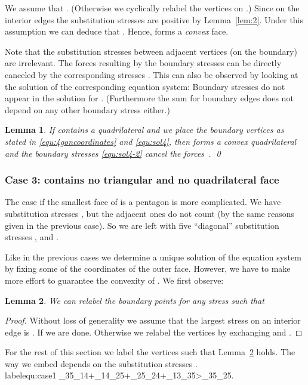 \documentclass{article}
\theoremstyle{plain} \newtheorem{thm}{Theorem}[section]
\newtheorem{lem}{Lemma}[section]
\newcommand{\ot}{\tilde{\omega}}
\begin{document}
We assume that .
(Otherwise we cyclically relabel the vertices on .) 
Since  on the interior edges the substitution stresses are positive by Lemma~\ref{lem:2}. Under this assumption we can deduce that . Hence,   forms a \emph{convex} face.


Note that the substitution stresses  between adjacent
vertices (on the boundary) are irrelevant. The 
forces resulting by the boundary stresses  
can be directly canceled by the
corresponding stresses . 
This can also be observed by looking at the solution  
of the corresponding equation system:
Boundary stresses do not appear in the solution for . (Furthermore 
the sum  for boundary edges 
does not depend on any other boundary stress either.)

\begin{lem}
If  contains a quadrilateral and we place the boundary vertices as
stated in \eqref{equ:4goncoordinates} and \eqref{equ:sol4}, 
then  forms a convex quadrilateral 
and the boundary stresses
 \eqref{equ:sol4-2}
 cancel the
forces~.
\qed
\end{lem}


\noindent
\subsubsection*{Case 3:  contains no triangular and no quadrilateral
  face}
The case if the smallest face of  is a  pentagon is more complicated. 
We have  substitution stresses , but the adjacent ones
do not count (by the same reasons given in the previous case).
So we are left with five ``diagonal'' substitution stresses
, and . 

Like in the previous cases we determine a unique solution of the equation system
by fixing some of the coordinates of the outer face. 
However, we have to make more effort to guarantee the
convexity of . We first observe:
\begin{lem}\label{lem:lemma5gon}
We can relabel the boundary points for any stress  such that

\end{lem}
\begin{proof}
Without loss of generality we assume that the largest stress on an
interior edge is . If
 we are done. Otherwise we relabel the vertices by
exchanging  and
.
\end{proof}
For the rest of this section we label the vertices such that Lemma~\ref{lem:lemma5gon} holds.
The way we embed   depends on the substitution stresses .\\label{equ:case1}
\ot_{35}\ot_{14}+\ot_{14}\ot_{25}+\ot_{25}\ot_{24}+\ot_{13}\ot_{35}>\ot_{35}\ot_{25}.
\end{document}
